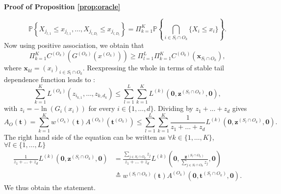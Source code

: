 \documentclass[11pt]{article}
\makeatletter
\renewenvironment{proof}[1][\proofname]{\par
\pushQED{\qed}%
\normalfont \topsep6\p@\@plus6\p@\relax
\trivlist
\item\relax
{\textbf{
#1\@addpunct{ }}}\hspace\labelsep\ignorespaces
}{%
\popQED\endtrivlist\@endpefalse
}
\makeatother
\begin{document}
\begin{proof}[Proof of Proposition \ref{prop:oracle}]
\begin{equation*}
			\mathbb{P}\left\{ X_{j_{l,1}} \leq x_{j_{l,1}}, \dots, X_{j_{l,D_l}} \leq x_{j_{l,D_l}} \right\} = \Pi_{k=1}^K \mathbb{P}\left\{ \bigcap_{i \in S_l \cap O_k } \{X_i \leq x_i \} \right\}.
		\end{equation*}
		Now using positive association, we obtain that
		\begin{equation*}
			\Pi_{k=1}^K C^{(O_k)}\left( G^{(O_k)}(x^{(O_k)})\right) \geq \Pi_{l=1}^L \Pi_{k=1}^K C^{(O_k)}\left(\textbf{x}_{S_l \cap O_k} \right),
		\end{equation*}
		where $\textbf{x}_{kl} = (x_i)_{i \in S_l \cap O_k}$. Reexpressing the whole in terms of stable tail dependence function leads to :
		\begin{equation*}
			\sum_{k=1}^K L^{(O_k)}(z_{i_{k,1}},\dots, z_{k,d_k}) \leq \sum_{l=1}^L \sum_{k=1}^K L^{(k)}(\textbf{0}, \textbf{z}^{(S_l \cap O_k)}, \textbf{0}),
		\end{equation*}
		with $z_i = -\ln (G_i(x_i))$ for every $i \in \{1, \dots, d\}$. Dividing by $z_1 + \dots + z_d$ gives
		\begin{equation*}
			A_{O} (\textbf{t}) = \sum_{k=1}^K w^{(O_k)}(\textbf{t}) A^{(O_k)}(\textbf{t}^{(O_k)}) \leq \sum_{l=1}^L \sum_{k=1}^K \frac{1}{z_1+\dots+z_d}L^{(k)}(\textbf{0}, \textbf{z}^{(S_l \cap O_k)}, \textbf{0}).
		\end{equation*}
		The right hand side of the equation can be written as $\forall k \in \{1,\dots, K\}$, $\forall l \in \{1,\dots, L\}$
		\begin{align*}
			\frac{1}{z_1 + \dots + z_d} L^{(k)}(\textbf{0}, \textbf{z}^{(S_l \cap O_k)}, \textbf{0}) &= \frac{\sum_{j \in S_l \cap O_k} z_j}{z_1 + \dots + z_d} L^{(k)}\left(\textbf{0}, \frac{\textbf{z}^{(S_l \cap O_k)}}{\sum_{j \in S_l \cap O_k} z_j}, \textbf{0}\right) \\
			&\triangleq w^{(S_l \cap O_k)}(\textbf{t}) A^{(O_k)}(\textbf{0}, \textbf{t}^{(S_l \cap O_k)}, \textbf{0}).
		\end{align*}
		We thus obtain the statement.
		

\end{proof}
\end{document}
